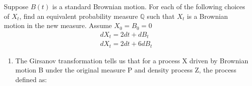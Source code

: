 \documentclass[12pt,a4paper]{exam}
\begin{document}
\begin{questions}
\question Suppose $B(t)$ is a standard Brownian motion. For each of the following choices of $X_t$, find an equivalent probability measure $\mathbb{Q}$ such that $X_t$ is a Brownian motion in the new measure. Assume $X_0=B_0=0$
\begin{equation*}
\begin{gathered}
dX_t = 2dt + dB_t\\
dX_t = 2dt + 6dB_t
\end{gathered}
\end{equation*}

\fillwithlines{3cm}
\begin{solution}
\begin{enumerate}[label=(\alph*),font=\itshape]
\item The Girsanov transformation tells us that for a process X driven by Brownian motion B under the original measure P and density process Z, the process defined as:

%
%
%
%
%
%
%
%
%
%
%
%
%
\end{enumerate}
\end{solution}


\end{questions}
\end{document}
